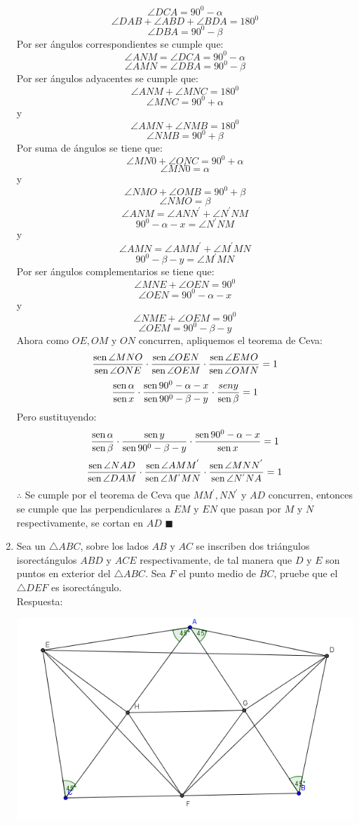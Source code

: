 \documentclass{book}
\newcommand{\sen}{\mathop{\rm sen}\nolimits} %
\begin{document}
\begin{enumerate}
        $$\angle DCA=90^0-\alpha$$
        $$\angle DAB+\angle ABD+\angle BDA=180^0$$
        $$\angle DBA=90^0-\beta$$
        Por ser ángulos correspondientes se cumple que:
        $$\angle ANM=\angle DCA=90^0-\alpha$$
        $$\angle AMN=\angle DBA=90^0-\beta$$
        Por ser ángulos adyacentes se cumple que:
        $$\angle ANM+\angle MNC=180^0$$
        $$\angle MNC=90^0+\alpha$$
        y
        $$\angle AMN+\angle NMB=180^0$$
        $$\angle NMB=90^0+ \beta$$
        Por suma de ángulos se tiene que:
        $$\angle MN0+\angle ONC=90^0+\alpha$$
        $$\angle MN0=\alpha$$
        y
        $$\angle NMO+\angle OMB=90^0+ \beta$$
        $$\angle NMO=\beta$$
        $$\angle ANM=\angle ANN^{'}+\angle N^{'}NM$$
        $$90^0-\alpha-x=\angle N^{'}NM$$
        y
        $$\angle AMN=\angle AMM^{'}+\angle M^{'}MN$$
        $$90^0-\beta-y=\angle M^{'}MN$$
        Por ser ángulos complementarios se tiene que:
        $$\angle MNE+\angle OEN=90^0$$
        $$\angle OEN=90^0-\alpha-x$$
        y
        $$\angle NME+\angle OEM=90^0$$
        $$\angle OEM=90^0-\beta-y$$
        Ahora como $OE,OM$ y $ON$ concurren, apliquemos el teorema de Ceva:
        $${\sen {\angle MNO}\over\sen {\angle ONE}}\cdot{\sen {\angle OEN}\over\sen {\angle OEM}}\cdot{\sen {\angle EMO}\over\sen {\angle OMN}}=1$$
        $${\sen \alpha\over\sen x}\cdot{\sen {90^0-\alpha-x}\over\sen {90^0-\beta-y}}\cdot{sen y\over\sen \beta}=1$$
        Pero sustituyendo:
        $${\sen \alpha\over\sen \beta}\cdot{\sen y\over\sen {90^0-\beta-y}}\cdot{\sen {90^0-\alpha-x}\over\sen x}=1$$
        $${\sen {\angle NAD}\over\sen {\angle DAM}}\cdot{\sen {\angle AMM^{'}}\over\sen {\angle M^{'} MN}}\cdot{\sen {\angle MNN^{'}}\over\sen {\angle N^{'} NA}}=1$$
        $\therefore$ Se cumple por el teorema de Ceva que $MM^{'},NN^{'}$ y $AD$ concurren, entonces se cumple que las perpendiculares a $EM$ y $EN$ que pasan por $M$ y $N$ respectivamente, se cortan en $AD$ $\blacksquare$\\
        \item Sea un $\triangle ABC$, sobre los lados $AB$ y $AC$ se inscriben dos triángulos isorectángulos $ABD$ y $ACE$ respectivamente, de tal manera que $D$ y $E$ son puntos en exterior del $\triangle ABC$. Sea $F$ el punto medio de $BC$, pruebe que el $\triangle DEF$ es isorectángulo.\\
        Respuesta:
        \begin{center}
            \includegraphics[scale=1]{imagenes/Geometria/20.png}

\end{center}
\end{enumerate}
\end{document}
